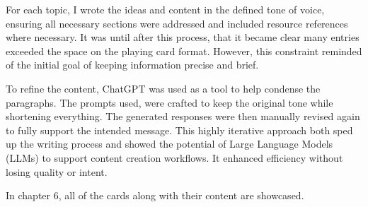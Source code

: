 For each topic, I wrote the ideas and content in the defined tone of voice, ensuring all necessary
sections were addressed and included resource references where necessary. It was until after this
process, that it became clear many entries exceeded the space on the playing card format. However,
this constraint reminded of the initial goal of keeping information precise and brief.

To refine the content, ChatGPT was used as a tool to help condense the paragraphs. The prompts used,
were crafted to keep the original tone while shortening everything. The generated responses were
then manually revised again to fully support the intended message. This highly iterative approach
both sped up the writing process and showed the potential of Large Language Models (LLMs) to support
content creation workflows. It enhanced efficiency without losing quality or intent.

In chapter 6, all of the cards along with their content are showcased.

